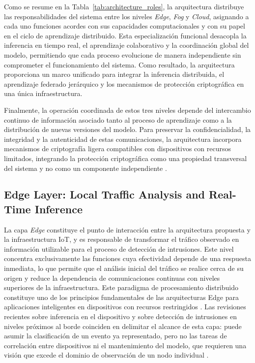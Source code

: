 \documentclass[journal,article,submit,moreauthors]{Definitions/mdpi}
\begin{document}
Como se resume en la Tabla~\ref{tab:architecture_roles}, la arquitectura distribuye las responsabilidades del sistema entre los niveles \textit{Edge}, \textit{Fog} y \textit{Cloud}, asignando a cada uno funciones acordes con sus capacidades computacionales y con su papel en el ciclo de aprendizaje distribuido. Esta especialización funcional desacopla la inferencia en tiempo real, el aprendizaje colaborativo y la coordinación global del modelo, permitiendo que cada proceso evolucione de manera independiente sin comprometer el funcionamiento del sistema. Como resultado, la arquitectura proporciona un marco unificado para integrar la inferencia distribuida, el aprendizaje federado jerárquico y los mecanismos de protección criptográfica en una única infraestructura.

Finalmente, la operación coordinada de estos tres niveles depende del intercambio continuo de información asociado tanto al proceso de aprendizaje como a la distribución de nuevas versiones del modelo. Para preservar la confidencialidad, la integridad y la autenticidad de estas comunicaciones, la arquitectura incorpora mecanismos de criptografía ligera compatibles con dispositivos con recursos limitados, integrando la protección criptográfica como una propiedad transversal del sistema y no como un componente independiente \cite{NIST800232,Kaur2025}.

\subsection{Edge Layer: Local Traffic Analysis and Real-Time Inference}
La capa \textit{Edge} constituye el punto de interacción entre la arquitectura propuesta y la infraestructura IoT, y es responsable de transformar el tráfico observado en información utilizable para el proceso de detección de intrusiones. Este nivel concentra exclusivamente las funciones cuya efectividad depende de una respuesta inmediata, lo que permite que el análisis inicial del tráfico se realice cerca de su origen y reduce la dependencia de comunicaciones continuas con niveles superiores de la infraestructura. Este paradigma de procesamiento distribuido constituye uno de los principios fundamentales de las arquitecturas Edge para aplicaciones inteligentes en dispositivos con recursos restringidos \cite{SaravanaBalaji2023,Ficco2024}. Las revisiones recientes sobre inferencia en el dispositivo y sobre detección de intrusiones en niveles próximos al borde coinciden en delimitar el alcance de esta capa: puede asumir la clasificación de un evento ya representado, pero no las tareas de correlación entre dispositivos ni el mantenimiento del modelo, que requieren una visión que excede el dominio de observación de un nodo individual \cite{HeydariSurvey2025,Tamuka2026}.
\end{document}
